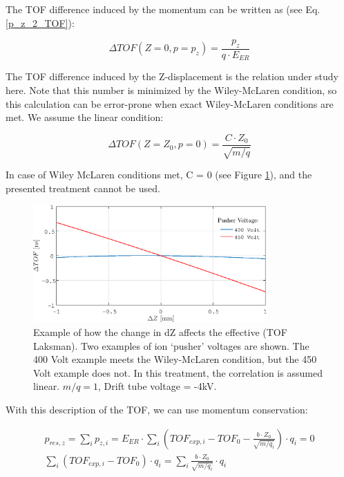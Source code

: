 The TOF difference induced by the momentum can be written as (see Eq. \ref{p_z_2_TOF}):

\begin{equation}
\Delta TOF (Z = 0, p = p_z) = \frac{p_z}{q \cdot E_{ER}}
\end{equation}

The TOF difference induced by the Z-displacement is the relation under study here. Note that this number is minimized by the Wiley-McLaren condition, so this calculation can be error-prone when exact Wiley-McLaren conditions are met. We assume the linear condition:

\begin{equation}
\Delta TOF (Z = Z_0, p = 0) = \frac{C \cdot Z_0}{\sqrt{m/q}}
\end{equation}

In case of Wiley McLaren conditions met, C = 0 (see Figure \ref{dZ_vs_dTOF_Laksman}), and the presented treatment cannot be used.

\begin{figure}[H]
   \centering
    \centerline{\includegraphics[width=0.8\textwidth]{Graphics/dZ_vs_dTOF_Laksman.eps}}
\caption{Example of how the change in dZ affects the effective (TOF Laksman). Two examples of ion `pusher' voltages are shown. The 400 Volt example meets the Wiley-McLaren condition, but the 450 Volt example does not. In this treatment, the correlation is assumed linear. $m/q = 1$, Drift tube voltage = -4kV.}
\label{dZ_vs_dTOF_Laksman}
\end{figure}

With this description of the TOF, we can use momentum conservation:

\begin{align}
p_{res, z} = \sum_i{p_{z, i}} = E_{ER} \cdot \sum_i{\left( TOF_{exp, i} - TOF_0 - \tfrac{b \cdot Z_0}{\sqrt{m/q_i}} \right) \cdot q_i} = 0\\
\sum_i{\left( TOF_{exp, i} - TOF_0 \right) \cdot q_i} = 
\sum_i{\tfrac{b \cdot Z_0}{\sqrt{m/q_i}} \cdot q_i }
\end{align}

